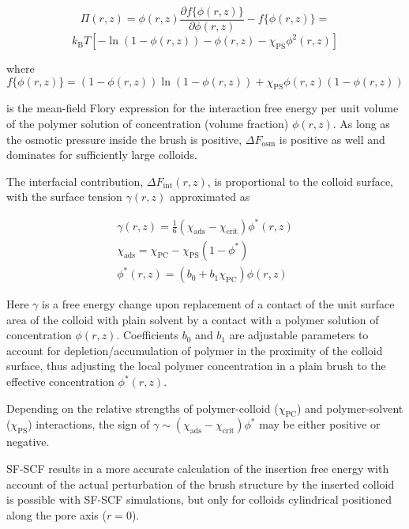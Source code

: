 \documentclass[12pt, a4paper]{article}
\begin{document}
$$
\Pi(r,z)=  \phi(r,z)\frac{\partial f\{\phi(r,z)\}}{\partial \phi(r,z)} - f\{\phi(r,z)\}= 
$$
\begin{equation}
	k_{\text{B}}T[-\ln(1-\phi(r,z)) - \phi(r,z) -\chi_{\text{PS}}\phi^2(r,z)]
\end{equation}

\noindent where
$$
f\{\phi(r,z)\}=(1-\phi(r,z))\ln(1-\phi(r,z)) +\chi_{\text{PS}}\phi(r,z)(1-\phi(r,z))
$$

\noindent is the mean-field Flory expression for the interaction free energy per unit volume of the polymer solution of concentration (volume fraction) $\phi(r,z)$.
As long as the osmotic pressure inside the brush is positive, $\Delta F_{\text{osm}}$ is positive as well and dominates for sufficiently large colloids. 

The interfacial contribution, $\Delta F_{\text{int}}(r,z)$, is proportional to the colloid surface, 
with the surface tension $\gamma (r,z)$ approximated as

\begin{eqnarray}
    \gamma (r,z)= \frac{1}{6}(\chi_{\text{ads}} - \chi_{\text{crit}})\phi^{\ast}(r,z)
    \\
    \chi_{\text{ads}} = \chi_{\text{PC}} - \chi_{\text{PS}}(1-\phi^{\ast})
    \\
    \phi^{\ast}(r,z)= (b_{0} + b_{1}\chi_{\text{PC}})\phi(r,z)
\end{eqnarray}

\noindent Here $\gamma$ is a free energy change upon replacement of a contact of the unit surface area of the colloid with plain solvent by a contact with a polymer solution of concentration $\phi(r,z)$.
Coefficients $b_0$ and $b_1$ are adjustable parameters to account for depletion/accumulation of polymer in the proximity of the colloid surface, 
thus adjusting the local polymer concentration in a plain brush to the effective concentration $\phi^{\ast}(r,z)$.

Depending on the relative strengths of polymer-colloid ($\chi_{\text{PC}}$) and polymer-solvent ($\chi_{\text{PS}}$) interactions, 
the sign of $\gamma\sim(\chi_{\text{ads}}-\chi_{\text{crit}})\phi^{\ast}$ may be either positive or negative.

SF-SCF results in a more accurate calculation of the insertion free energy with account of the actual perturbation of the brush structure by the inserted colloid is possible with SF-SCF simulations, but only for colloids cylindrical positioned along the pore axis ($r=0$).
\end{document}
